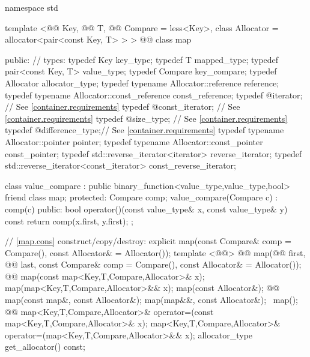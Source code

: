 \documentclass[american,twoside]{book}
\begin{document}
\begin{codeblock}
namespace std {
  template <@@ Key, @@ T, 
            @@ Compare = less<Key>,
            class Allocator = allocator<pair<const Key, T> > >
  @@
  class map {
  public:
    // types:
    typedef Key                                   key_type;
    typedef T                                     mapped_type;
    typedef pair<const Key, T>                    value_type;
    typedef Compare                               key_compare;
    typedef Allocator                             allocator_type;
    typedef typename Allocator::reference         reference;
    typedef typename Allocator::const_reference   const_reference;
    typedef @\impdef@                iterator;       // See \ref{container.requirements}
    typedef @\impdef@                const_iterator; // See \ref{container.requirements}
    typedef @\impdef@                size_type;      // See \ref{container.requirements}
    typedef @\impdef@                difference_type;// See \ref{container.requirements}
    typedef typename Allocator::pointer           pointer;
    typedef typename Allocator::const_pointer     const_pointer;
    typedef std::reverse_iterator<iterator>       reverse_iterator;
    typedef std::reverse_iterator<const_iterator> const_reverse_iterator;

    class value_compare
      : public binary_function<value_type,value_type,bool> {
    friend class map;
    protected:
      Compare comp;
      value_compare(Compare c) : comp(c) {}
    public:
      bool operator()(const value_type& x, const value_type& y) const {
        return comp(x.first, y.first);
      }
    };

    // \ref{map.cons} construct/copy/destroy:
    explicit map(const Compare& comp = Compare(),
                 const Allocator& = Allocator());
    template <@@>
      @@
      map(@@ first, @@ last,
          const Compare& comp = Compare(), const Allocator& = Allocator());
    @@ map(const map<Key,T,Compare,Allocator>& x);
    map(map<Key,T,Compare,Allocator>&& x);
    map(const Allocator&);
    @@ map(const map&, const Allocator&);
    map(map&&, const Allocator&);
   ~map();
    @@ 
      map<Key,T,Compare,Allocator>& operator=(const map<Key,T,Compare,Allocator>& x);
    map<Key,T,Compare,Allocator>&
      operator=(map<Key,T,Compare,Allocator>&& x);
    allocator_type get_allocator() const;

}}
\end{codeblock}
\end{document}
